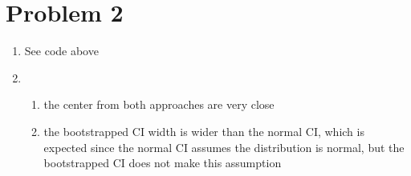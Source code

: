 \documentclass{article}
\begin{document}
\section*{Problem 2}

\begin{enumerate}[label=(\alph*)]
\item See code above
\item
\begin{enumerate}[label=(\roman*)]
\item the center from both approaches are very close
\item the bootstrapped CI width is wider than the normal CI, which is expected since the normal CI assumes the distribution is normal, but the bootstrapped CI does not make this assumption

\end{enumerate}
\end{enumerate}
\end{document}

